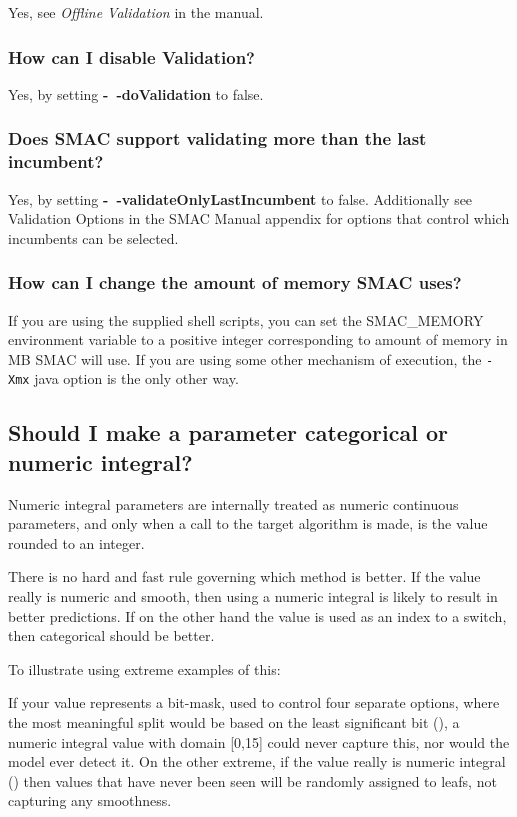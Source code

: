 \documentclass[11pt,letterpaper,oneside]{article}
\begin{document}
	Yes, see \emph{Offline Validation} in the manual.

	
\subsubsection{How can I disable Validation?}

	Yes, by setting \textbf{-~$\!$-doValidation} to false.
	
\subsubsection{Does SMAC support validating more than the last incumbent?}

	Yes, by setting \textbf{-~$\!$-validateOnlyLastIncumbent} to false. Additionally see {Validation Options} in the SMAC Manual appendix for options that control which incumbents can be selected.


\subsubsection{How can I change the amount of memory SMAC uses?}

If you are using the supplied shell scripts, you can set the SMAC\_MEMORY environment variable to a positive integer corresponding to amount of memory in MB SMAC will use. If you are using some other mechanism of execution, the \texttt{-Xmx} java option is the only other way.


\subsection{Should I make a parameter categorical or numeric integral?}

	Numeric integral parameters are internally treated as numeric continuous parameters, and only when a call to the target algorithm is made, is the value rounded to an integer. 
	
	There is no hard and fast rule governing which method is better. If the value really is numeric and smooth, then using a numeric integral is likely to result in better predictions. If on the other hand the value is used as an index to a switch, then categorical should be better.
	
	To illustrate using extreme examples of this:
	
	If your value represents a bit-mask, used to control four separate options, where the most meaningful split would be based on the least significant bit (), a numeric integral value with domain [0,15] could never capture this, nor would the model ever detect it. On the other extreme, if the value really is numeric integral (\eg{[0, 1024]}) then values that have never been seen will be randomly assigned to leafs, not capturing any smoothness.
		
\end{document}
